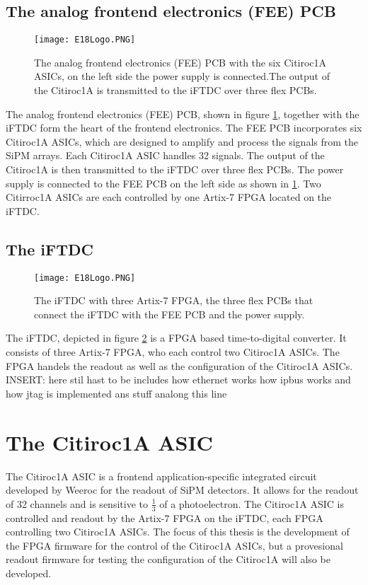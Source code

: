 \subsection{The analog frontend electronics (FEE) PCB}
\begin{figure}[H]
    \centering
    \texttt{[image: E18Logo.PNG]}
    \caption{The analog frontend electronics (FEE) PCB with the six Citiroc1A ASICs, on the left side the power supply is connected.The output of the Citiroc1A is transmitted to the iFTDC over three flex PCBs.\autocite{InternalcommunicationKarl}}
    \label{fig:FEE}
\end{figure}
The analog frontend electronics (FEE) PCB, shown in figure \ref{fig:FEE}, together with the iFTDC form the heart of the frontend electronics.
The FEE PCB incorporates six Citiroc1A ASICs, which are designed to amplify and process the signals from the SiPM arrays.
 Each Citiroc1A ASIC handles 32 signals. The output of the Citiroc1A is then transmitted to the iFTDC over three flex PCBs.
The power supply is connected to the FEE PCB on the left side as shown in \ref{fig:FEE}. Two Citirroc1A ASICs are each controlled by one Artix-7 FPGA located on the iFTDC.\autocite{InternalcommunicationIgor}
\subsection{The iFTDC}
\begin{figure}[H]
    \centering
    \texttt{[image: E18Logo.PNG]}
    \caption{The iFTDC with three Artix-7 FPGA, the three flex PCBs that connect the iFTDC with the FEE PCB and the power supply.\autocite{InternalcommunicationIgor}}
    \label{fig:iFTDC}
\end{figure}

The iFTDC, depicted in figure \ref{fig:iFTDC} is a FPGA based time-to-digital converter. It consists of three Artix-7 FPGA, who each control two Citiroc1A ASICs.
The FPGA handels the readout as well as the configuration of the Citiroc1A ASICs\autocite{InternalcommunicationIgor}.
\newline
INSERT: here stil hast to be includes how ethernet works how ipbus works and how jtag is implemented ans stuff analong this line 
\section{The Citiroc1A ASIC}
The Citiroc1A ASIC is a frontend application-specific integrated circuit developed by Weeroc for the readout of SiPM detectors.
It allows for the readout of 32 channels and is sensitive to $\frac{1}{3}$ of a photoelectron.\autocite{datasheetCITIROC}
\newline
The Citiroc1A ASIC is controlled and readout by the Artix-7 FPGA on the iFTDC, each FPGA controlling two Citiroc1A ASICs.\autocite{InternalcommunicationIgor}
The focus of this thesis is the development of the FPGA firmware for the control of the Citiroc1A ASICs,
 but a provesional readout firmware for testing the configuration of the Citiroc1A will also be developed.
